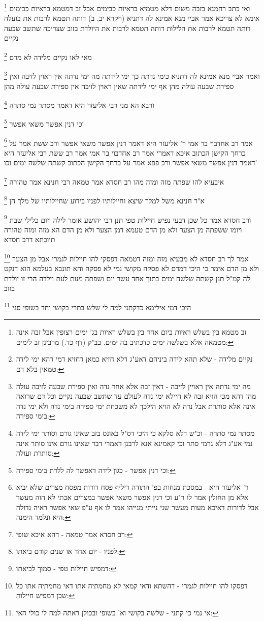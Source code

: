 \documentclass[12pt, openany]{book}
\newcommand{\footnotecomment}[1]{
	\renewcommand\thefootnote{}
	\footnote{#1}}
\newcommand{\commenta}[1]{\footnotecomment{#1}}
\begin{document}
{\commenta{זב מטמא בין בשלש ראיות ביום אחד בין בשלש ראיות בג' ימים רצופין אבל זבה אינה מטמאה אלא בשלשה ימים כדכתיב בה ימים. בב"ק (דף כד.) מרבינן זב לימים: }
ואי כתב רחמנא בזבה משום דלא מטמיא בראיות כבימים אבל זב דמטמא בראיות כבימים אימא לא צריכא 
אמר אביי מנא אמינא לה דתניא (ויקרא יב, ב) דותה תטמא לרבות את בועלה
דותה תטמא לרבות את הלילות דותה תטמא לרבות את היולדת בזוב שצריכה שתשב שבעה נקיים 
\commenta{נקיים מלידה - שלא תהא לידה ביניהם דאע"ג דלא חזיא כמאן דחזיא דמי דהא ימי לידה טמאין בלא דם:}
מאי לאו נקיים מלידה לא מדם 
\commenta{מה ימי נדתה אין ראויין לזיבה - דאין זבה אלא אחר נדה ואין ספירת שבעה לזיבה עולה מהן דהא מכי הויא זבה לא חיילא ימי נדה לעולם עד שתשב שבעה נקיים וכל דם שרואה אינה אלא סותרת אבל נדה לא הויא הילכך לא משכחת ימי ספירה בימי נדה ולא ימי נדה בימי ספירה:}
ואמר אביי מנא אמינא לה דתניא כימי נדתה כך ימי לידתה מה ימי נדתה אין ראוין לזיבה ואין ספירת שבעה עולה מהן אף ימי לידתה שאין ראוין לזיבה אין ספירת שבעה עולה מהן 
\commenta{מסתר נמי סתרה - וכ"ש דלא סלקא כי היכי דס"ל באונס בזב שאינו גורם וסותר ימי לידה נמי אע"ג דלא גרמי סתר וכי קאמינא אנא לרבנן דאמרי דבר שאינו גורם אינו סותר אינה סותרת ועולה:}
ורבא הא מני רבי אליעזר היא דאמר מסתר נמי סתרה 
\commenta{וכי דנין אפשר - כגון לידה דאפשר לה ללדת בימי ספירה:}
וכי דנין אפשר משאי אפשר 
\commenta{ר' אליעזר היא - במסכת מנחות בפ' התודה דיליף פסח דורות מפסח מצרים שלא יביא אלא מן החולין אמר לו ר"ע וכי דנין אפשר משאי אפשר במצרים אכתי לא הוה מעשר אבל לדורות דאיכא מעות מעשר שני נייתי מנייהו אמר לו אף ע"פ שאי אפשר ראיה גדולה היא ונלמד הימנה:}
אמר רב אחדבוי בר אמי ר' אליעזר היא דאמר דנין אפשר משאי אפשר ורב ששת אמר על כרחך הקישן הכתוב איכא דאמרי אמר רב אחדבוי בר אמי אמר רב ששת רבי אליעזר היא דאמר דנין אפשר משאי אפשר ורב פפא אמר על כרחך הקישן הכתוב
קשתה שלשה ימים וכו'
\commenta{רב חסדא אמר טמאה - דהא איכא שופי:}
איבעיא להו שפתה מזה ומזה מהו רב חסדא אמר טמאה רבי חנינא אמר טהורה 
\commenta{לפניו - יום אחד או שנים קודם ביאתו:}
א"ר חנינא משל למלך שיצא וחיילותיו לפניו בידוע שחיילותיו של מלך הן 
\commenta{דמפיש חיילות טפי - סמוך לביאתו:}
ורב חסדא אמר כל שכן דבעי נפיש חיילות טפי 
תנן רבי יהושע אומר לילה ויום כלילי שבת ויומו ששפתה מן הצער ולא מן הדם טעמא דמן הצער ולא מן הדם הא מזה ומזה טהורה תיובתא דרב חסדא 
\commenta{דפסקו להו חיילות לגמרי - דהשתא ודאי קמאי לא מחמתיה אתו דאי מחמתיה אתו כל שכן דמפיש חיילות:}
אמר לך רב חסדא לא מבעיא מזה ומזה דטמאה דפסקי להו חיילות לגמרי אבל מן הצער ולא מן הדם אימר כי היכי דמדם לא פסקה מקושי נמי לא פסקה והא תונבא בעלמא הוא דנקט לה קמ"ל 
תנן קשתה שלשה ימים בתוך אחד עשר יום ושפתה מעת לעת וילדה הרי זו יולדת בזוב 
\commenta{אי נמי כי קתני - שלשה בקושי וא' בשופי ובכולן ראתה למה לי כולי האי:}
היכי דמי אילימא כדקתני למה לי שלש בתרי בקושי וחד בשופי סגי 
}
\end{document}
